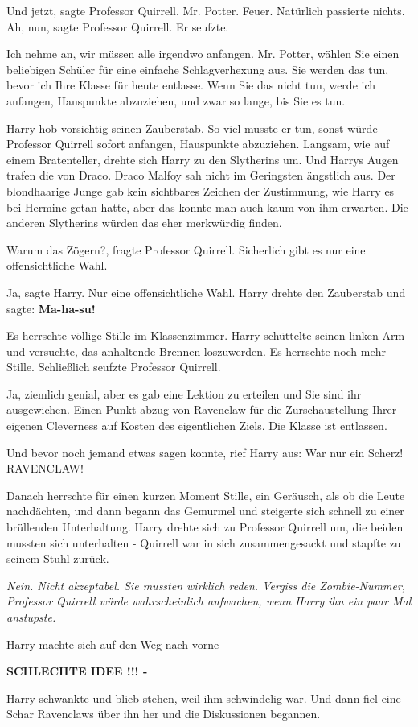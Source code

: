 \glqq{}Und jetzt\grqq{}, sagte Professor Quirrell. \glqq{}Mr. Potter.
Feuer.\grqq{} Natürlich passierte nichts. \glqq{}Ah, nun\grqq{}, sagte Professor
Quirrell. Er seufzte.

\glqq{}Ich nehme an, wir müssen alle irgendwo anfangen. Mr. Potter, wählen Sie
einen beliebigen Schüler für eine einfache Schlagverhexung aus. Sie werden das
tun, bevor ich Ihre Klasse für heute entlasse. Wenn Sie das nicht tun, werde ich
anfangen, Hauspunkte abzuziehen, und zwar so lange, bis Sie es tun.\grqq{}

Harry hob vorsichtig seinen Zauberstab. So viel musste er tun, sonst würde
Professor Quirrell sofort anfangen, Hauspunkte abzuziehen. Langsam, wie auf
einem Bratenteller, drehte sich Harry zu den Slytherins um. Und Harrys Augen
trafen die von Draco. Draco Malfoy sah nicht im Geringsten ängstlich aus. Der
blondhaarige Junge gab kein sichtbares Zeichen der Zustimmung, wie Harry es bei
Hermine getan hatte, aber das konnte man auch kaum von ihm erwarten. Die anderen
Slytherins würden das eher merkwürdig finden.

\glqq{}Warum das Zögern?\grqq{}, fragte Professor Quirrell. \glqq{}Sicherlich gibt
es nur eine offensichtliche Wahl.\grqq{}

\glqq{}Ja\grqq{}, sagte Harry. \glqq{}Nur eine offensichtliche Wahl.\grqq{} Harry
drehte den Zauberstab und sagte: \textbf{\glqq{}Ma-ha-su!\grqq{}}

Es herrschte völlige Stille im Klassenzimmer. Harry schüttelte seinen linken Arm
und versuchte, das anhaltende Brennen loszuwerden. Es herrschte noch mehr
Stille. Schließlich seufzte Professor Quirrell.

\glqq{}Ja, ziemlich genial, aber es gab eine Lektion zu erteilen und Sie sind ihr
ausgewichen. Einen Punkt abzug von Ravenclaw für die Zurschaustellung Ihrer
eigenen Cleverness auf Kosten des eigentlichen Ziels. Die Klasse ist
entlassen.\grqq{}

Und bevor noch jemand etwas sagen konnte, rief Harry aus: \glqq{}War nur ein
Scherz! RAVENCLAW!\grqq{}

Danach herrschte für einen kurzen Moment Stille, ein Geräusch, als ob die Leute
nachdächten, und dann begann das Gemurmel und steigerte sich schnell zu einer
brüllenden Unterhaltung. Harry drehte sich zu Professor Quirrell um, die beiden
mussten sich unterhalten - Quirrell war in sich zusammengesackt und stapfte zu
seinem Stuhl zurück.

\emph{Nein. Nicht akzeptabel. Sie mussten wirklich reden. Vergiss die
Zombie-Nummer, Professor Quirrell würde wahrscheinlich aufwachen, wenn Harry ihn
ein paar Mal anstupste.}

Harry machte sich auf den Weg nach vorne -

\textbf{SCHLECHTE IDEE !!! -}

Harry schwankte und blieb stehen, weil ihm schwindelig war. Und dann fiel eine
Schar Ravenclaws über ihn her und die Diskussionen begannen.
